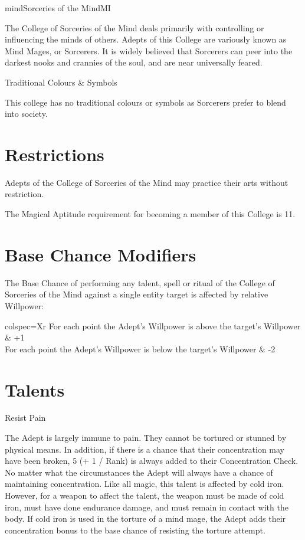 \begin{College}[1.6]{mind}{Sorceries of the Mind}{MI}

The College of Sorceries of the Mind deals primarily with controlling
or influencing the minds of others. Adepts of this College are
variously known as Mind Mages, or Sorcerers. It is widely believed
that Sorcerers can peer into the darkest nooks and crannies of the
soul, and are near universally feared.

Traditional Colours \& Symbols  

This college has no traditional colours or symbols as Sorcerers prefer
to blend into society.

\section{Restrictions}

Adepts of the College of Sorceries of the Mind may practice their arts
without restriction.

The Magical Aptitude requirement for becoming a member of this College
is 11.

\section{Base Chance Modifiers}

The Base Chance of performing any talent, spell or ritual of the
College of Sorceries of the Mind against a single entity target is
affected by relative Willpower:

\begin{dqtblr}{colspec={Xr}}
For each point the Adept’s Willpower is above the target’s Willpower & +1 \\
For each point the Adept’s Willpower is below the target’s Willpower & -2 \\
\end{dqtblr}

\section{Talents}

\begin{talent}[T-1]{Resist Pain}

\begin{effects}
The Adept is largely immune to pain. They cannot be tortured or
stunned by physical means.  In addition, if there is a chance that
their concentration may have been broken, 5 (+ 1 / Rank) is always
added to their Concentration Check.  No matter what the circumstances
the Adept will always have a chance of maintaining concentration.
Like all magic, this talent is affected by cold iron.  However, for a
weapon to affect the talent, the weapon must be made of cold iron,
must have done endurance damage, and must remain in contact with the
body. If cold iron is used in the torture of a mind mage, the Adept
adds their concentration bonus to the base chance of resisting the
torture attempt.
\end{effects}
\end{talent}


\end{College}
